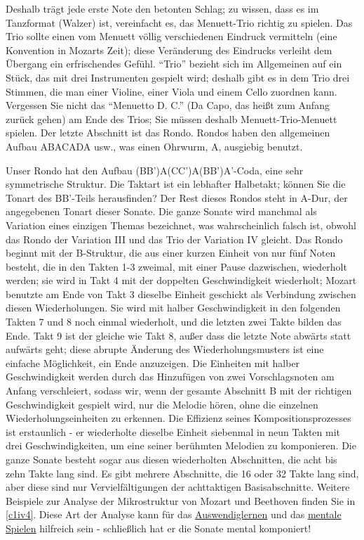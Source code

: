 Deshalb trägt jede erste Note den betonten Schlag; zu wissen, dass es im Tanzformat (Walzer) ist, vereinfacht es, das Menuett-Trio richtig zu spielen.
Das Trio sollte einen vom Menuett völlig verschiedenen Eindruck vermitteln (eine Konvention in Mozarts Zeit); diese Veränderung des Eindrucks verleiht dem Übergang ein erfrischendes Gefühl.
\enquote{Trio} bezieht sich im Allgemeinen auf ein Stück, das mit drei Instrumenten gespielt wird; deshalb gibt es in dem Trio drei Stimmen, die man einer Violine, einer Viola und einem Cello zuordnen kann.
Vergessen Sie nicht das \enquote{Menuetto D. C.} (Da Capo, das heißt zum Anfang zurück gehen) am Ende des Trios; Sie müssen deshalb Menuett-Trio-Menuett spielen.
Der letzte Abschnitt ist das Rondo.
Rondos haben den allgemeinen Aufbau ABACADA usw., was einen Ohrwurm, A, ausgiebig benutzt.


Unser Rondo hat den Aufbau (BB')A(CC')A(BB')A'-Coda, eine sehr symmetrische Struktur.
Die Taktart ist ein lebhafter Halbetakt; können Sie die Tonart des BB'-Teils herausfinden?
Der Rest dieses Rondos steht in A-Dur, der angegebenen Tonart dieser Sonate.
Die ganze Sonate wird manchmal als Variation eines einzigen Themas bezeichnet, was wahrscheinlich falsch ist, obwohl das Rondo 
der Variation III und das Trio der Variation IV gleicht.
Das Rondo beginnt mit der B-Struktur, die aus einer kurzen Einheit von nur fünf Noten besteht, die in den Takten 1-3 zweimal, mit einer Pause dazwischen, wiederholt werden; sie wird in Takt 4 mit der doppelten Geschwindigkeit wiederholt; Mozart benutzte am Ende von Takt 3 dieselbe Einheit geschickt als Verbindung zwischen diesen Wiederholungen.
Sie wird mit halber Geschwindigkeit in den folgenden Takten 7 und 8 noch einmal wiederholt, und die letzten zwei Takte bilden das Ende.
Takt 9 ist der gleiche wie Takt 8, außer dass die letzte Note abwärts statt aufwärts geht; diese abrupte Änderung des Wiederholungsmusters ist eine einfache Möglichkeit, ein Ende anzuzeigen.
Die Einheiten mit halber Geschwindigkeit werden durch das Hinzufügen von zwei Vorschlagsnoten am Anfang verschleiert, sodass wir, wenn der gesamte Abschnitt B mit der richtigen Geschwindigkeit gespielt wird, nur die Melodie hören, ohne die einzelnen Wiederholungseinheiten zu erkennen.
Die Effizienz seines Kompositionsprozesses ist erstaunlich - er wiederholte dieselbe Einheit siebenmal in neun Takten mit drei Geschwindigkeiten, um eine seiner berühmten Melodien zu komponieren.
Die ganze Sonate besteht sogar aus diesen wiederholten Abschnitten, die acht bis zehn Takte lang sind.
Es gibt mehrere Abschnitte, die 16 oder 32 Takte lang sind, aber diese sind nur Vervielfältigungen der achttaktigen Basisabschnitte.
Weitere Beispiele zur Analyse der Mikrostruktur von Mozart und Beethoven finden Sie in \hyperref[c1iv4]{\autoref{c1iv4}}.
Diese Art der Analyse kann für das \hyperref[c1iii6]{Auswendiglernen} und das \hyperref[c1ii12mental]{mentale Spielen} hilfreich sein - schließlich hat er die Sonate mental komponiert!


